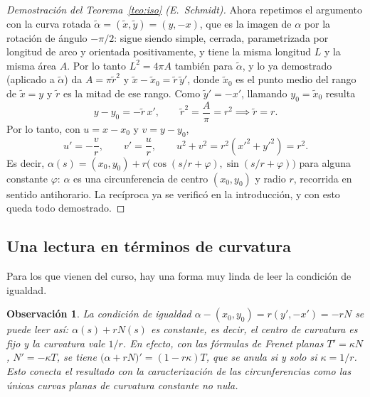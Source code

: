 \documentclass[12pt,a4paper]{article}
\theoremstyle{profesional}
\theoremstyle{definicion-style}
\newtheorem{observacion}[teorema]{Observación}
\begin{document}
\begin{proof}[Demostración del Teorema~\ref{teo:iso} (E.~Schmidt)]
    Ahora repetimos el argumento con la curva rotada \( \tilde\alpha = (\tilde x, \tilde y) = (y, -x) \), que es la imagen de \( \alpha \) por la rotación de ángulo \( -\pi/2 \): sigue siendo simple, cerrada, parametrizada por longitud de arco y orientada positivamente, y
    tiene la misma longitud \( L \) y la misma área \( A \). Por lo tanto \( L^2 = 4\pi A \) también para \( \tilde\alpha \), y lo ya demostrado (aplicado a \( \tilde\alpha \)) da \( A = \pi \tilde r^2 \) y \( \tilde x - \tilde x_0 = \tilde r \, \tilde y' \),
    donde \( \tilde x_0 \) es el punto medio del rango de \( \tilde x = y \) y \( \tilde r \) es la mitad de ese rango. Como \( \tilde y' = -x' \), llamando \( y_0 = \tilde x_0 \) resulta
    \[
        y - y_0 = - \tilde r \, x', \qquad \tilde r^2 = \frac{A}{\pi} = r^2 \implies \tilde r = r.
    \]
    Por lo tanto, con \( u = x - x_0 \) y \( v = y - y_0 \),
    \[
        u' = -\frac{v}{r}, \qquad v' = \frac{u}{r}, \qquad u^2 + v^2 = r^2 \left( x'^2 + y'^2 \right) = r^2.
    \]
    Es decir, \( \alpha(s) = (x_0, y_0) + r \big( \cos(s/r + \varphi), \sin(s/r + \varphi) \big) \) para alguna constante \( \varphi \): \( \alpha \) es una circunferencia de centro \( (x_0, y_0) \) y radio \( r \), recorrida en sentido antihorario.
    La recíproca ya se verificó en la introducción, y con esto queda todo demostrado.
\end{proof}

\subsection{Una lectura en términos de curvatura}

Para los que vienen del curso, hay una forma muy linda de leer la condición de igualdad.

\begin{observacion}
    La condición de igualdad \( \alpha - (x_0, y_0) = r (y', -x') = -r N \) se puede leer así: \( \alpha(s) + r N(s) \) es constante, es decir, el centro de curvatura es fijo y la curvatura vale \( 1/r \). En efecto, con las fórmulas de Frenet planas
    \( T' = \kappa N \), \( N' = -\kappa T \), se tiene \( \big( \alpha + r N \big)' = (1 - r \kappa) T \), que se anula si y solo si \( \kappa = 1/r \). Esto conecta el resultado con la caracterización de las circunferencias como las únicas curvas planas de curvatura constante no nula.
\end{observacion}

\newpage
\end{document}
